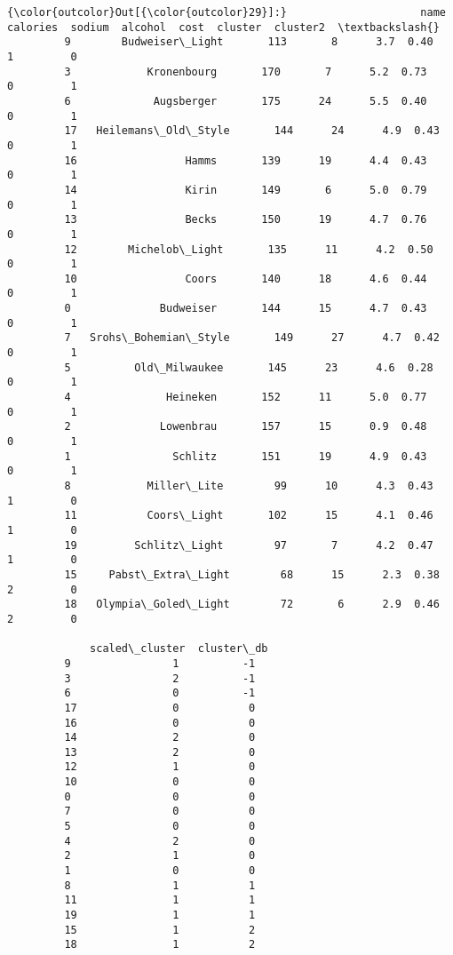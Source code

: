 \documentclass[11pt]{article}
\begin{document}
\begin{Verbatim}[commandchars=\\\{\}]
{\color{outcolor}Out[{\color{outcolor}29}]:}                     name  calories  sodium  alcohol  cost  cluster  cluster2  \textbackslash{}
         9        Budweiser\_Light       113       8      3.7  0.40        1         0   
         3            Kronenbourg       170       7      5.2  0.73        0         1   
         6             Augsberger       175      24      5.5  0.40        0         1   
         17   Heilemans\_Old\_Style       144      24      4.9  0.43        0         1   
         16                 Hamms       139      19      4.4  0.43        0         1   
         14                 Kirin       149       6      5.0  0.79        0         1   
         13                 Becks       150      19      4.7  0.76        0         1   
         12        Michelob\_Light       135      11      4.2  0.50        0         1   
         10                 Coors       140      18      4.6  0.44        0         1   
         0              Budweiser       144      15      4.7  0.43        0         1   
         7   Srohs\_Bohemian\_Style       149      27      4.7  0.42        0         1   
         5          Old\_Milwaukee       145      23      4.6  0.28        0         1   
         4               Heineken       152      11      5.0  0.77        0         1   
         2              Lowenbrau       157      15      0.9  0.48        0         1   
         1                Schlitz       151      19      4.9  0.43        0         1   
         8            Miller\_Lite        99      10      4.3  0.43        1         0   
         11           Coors\_Light       102      15      4.1  0.46        1         0   
         19         Schlitz\_Light        97       7      4.2  0.47        1         0   
         15     Pabst\_Extra\_Light        68      15      2.3  0.38        2         0   
         18   Olympia\_Goled\_Light        72       6      2.9  0.46        2         0   
         
             scaled\_cluster  cluster\_db  
         9                1          -1  
         3                2          -1  
         6                0          -1  
         17               0           0  
         16               0           0  
         14               2           0  
         13               2           0  
         12               1           0  
         10               0           0  
         0                0           0  
         7                0           0  
         5                0           0  
         4                2           0  
         2                1           0  
         1                0           0  
         8                1           1  
         11               1           1  
         19               1           1  
         15               1           2  
         18               1           2  
\end{Verbatim}
            
\end{document}
